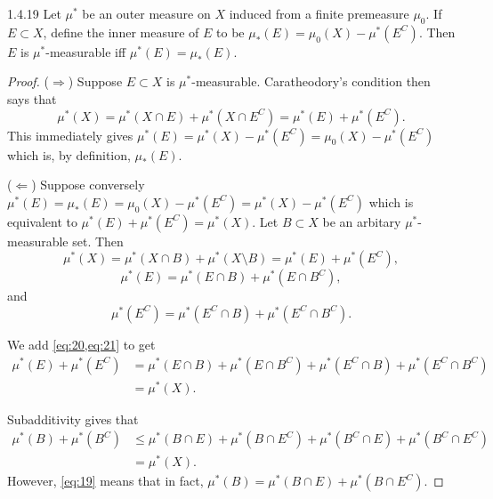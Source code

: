 \documentclass[11pt]{article}
\begin{document}
\begin{problem}{1.4.19}
	Let \( \mu^{*} \) be an outer measure on \( X \) induced from a finite premeasure \(\mu_0\).
	If \( E \subset X \), define the inner measure of \( E \) to be \(\mu_{*}(E)= \mu_0(X) - \mu^{*}(E^C)\).
	Then \( E \) is \( \mu^{*} \)-measurable iff \(\mu^{*}(E)= \mu_{*}(E)\).
\end{problem}
\begin{proof}
	(\(\Rightarrow\)) Suppose \( E \subset X \) is \( \mu^{*} \)-measurable.
	Caratheodory's condition then says that
	\begin{equation}
		\label{eq:13}
		\mu^{*}(X) = \mu^{*}(X \cap E) + \mu^{*}(X \cap E^C) = \mu^{*}(E) + \mu^{*}(E^C).
	\end{equation}
	This immediately gives \( \mu^{*}(E) = \mu^{*}(X) - \mu^{*}(E^C) = \mu_0(X) - \mu^{*}(E^C)\) which is, by definition, \(\mu_{*}(E)\).

	(\(\Leftarrow\)) Suppose conversely \( \mu^{*}(E) = \mu_{*}(E) = \mu_0(X) - \mu^{*}(E^C) = \mu^{*}(X) - \mu^{*}(E^C)\) which is equivalent to \( \mu^{*}(E) + \mu^{*}(E^C) = \mu^{*}(X) \).
  Let \( B \subset X \) be an arbitary \(\mu^{*}\)-measurable set.
  Then
  \begin{equation}
  \label{eq:19}
  \mu^{*}(X) = \mu^{*}(X \cap B) + \mu^{*}(X \setminus B) = \mu^{*}(E) + \mu^{*}(E^C),
\end{equation}
\begin{equation}
\label{eq:20}
\mu^{*}(E) = \mu^{*}(E \cap B) + \mu^{*}(E \cap B^C),
\end{equation}
and
\begin{equation}
\label{eq:21}
\mu^{*}(E^C) = \mu^{*}(E^C \cap B) + \mu^{*}(E^C \cap B^C).
\end{equation}

We add \cref{eq:20,eq:21} to get
\begin{equation}
\label{eq:22}
\begin{aligned}
  \mu^{*}(E) + \mu^{*}(E^C) &= \mu^{*}(E \cap B) + \mu^{*}(E \cap B^C) + \mu^{*}(E^C \cap B) + \mu^{*}(E^C \cap B^C) \\
  &= \mu^{*}(X).
\end{aligned}
\end{equation}

Subadditivity gives that
\begin{equation}
\label{eq:23}
\begin{aligned}
  \mu^{*}(B) + \mu^{*}(B^C) &\leq \mu^{*}(B \cap E) + \mu^{*}(B \cap E^C) + \mu^{*}(B^C \cap E) + \mu^{*}(B^C \cap E^{C}) \\
  &= \mu^{*}(X).
\end{aligned}
\end{equation}
However, \cref{eq:19} means that in fact, \(\mu^{*}(B) = \mu^{*}(B \cap E) + \mu^{*}(B \cap E^C)\).


\end{proof}
\end{document}
